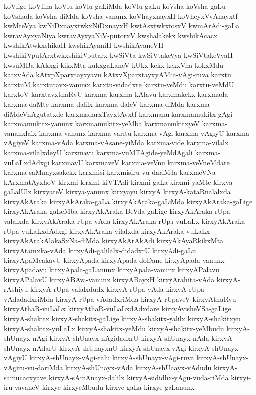 {koVlige
koVlina
koVlu
koVlu-gaLiMda
koVlu-gaLu
koVsha
koVsha-gaLu
koVshada
koVsha-diMda
koVsha-vanunx
koVhayxnayxH
koVheyxVvAnayxtf
kwMteVya
kwNiDxnayxtwkxNiDxnayxH
kwtAsxtwkxtosxV
kwmArAdi-gaLa
kwravAyxyaNiya
kwravAyxyaNiV-putorxV
kwshalakekx
kwshikAcacx
kwshikAtwkxshikaH
kwshikAyaniH
kwshikAyaneVH
kwshikiVputArxtwkxshikiVputarx
kwSiVta
kwSiVtakeVya
kwSiVtakeVyaH
kwsuMBa
kAkxgi
kikxMta
kukxgaLaneV
kUkx
kekx
kekxVna
kokxMdu
katxvAda
kAtxpXparxtayxyavu
kAtxvXparxtayxyAMta-vAgi-ruva
karxtu
karxtuM
karxtutavx-vanunx
karxtu-vidadxre
karxtu-veMdu
karxtu-veMdU
karxtoV
karxtavxthaRvU
karxma
karxma-kAlavu
karxmakekx
karxmada
karxma-daMte
karxma-dalilx
karxma-daleV
karxma-diMda
karxma-diMdeVnAgutatxde
karxmadarxTayxtAvxtf
karxmanu
karxmamukitx-gAgi
karxmamukitx-yanunx
karxmamukitx-yeMba
karxmamukitxyeV
karxma-vananxlalx
karxma-vanunx
karxma-varitu
karxma-vAgi
karxma-vAgiyU
karxma-vAgiyeV
karxma-vAda
karxma-vAsane-yiMda
karxma-vide
karxma-vilalx
karxma-vilalxdeyU
karxmavu
karxma-vuMTAgide-yeMdAgali
karxma-vuLaLxdAdxgi
karxmavU
karxmaveV
karxma-veVnu
karxma-veVneMdare
karxma-saMnayxsakekx
karxmisi
karxmisiru-vu-dariMda
karxmeVNa
kArxmatAyxhoV
kirxmi
kirxmi-kiVTAdi
kirxmi-gaLa
kirxmi-yaMte
kirxya-gaLalUlx
kirxyateV
kirxya-yanunx
kirxyayu
kirxyA
kirxyA-kataRnalalxda
kirxyAkAraka
kirxyAkAraka-gaLa
kirxyAkAraka-gaLiMda
kirxyAkAraka-gaLige
kirxyAkAraka-gaLeMba
kirxyAkAraka-BeVda-gaLige
kirxyAkAraka-rUpa-valalxda
kirxyAkAraka-rUpa-vAda
kirxyAkAraka-rUpa-vuLaLx
kirxyAkAraka-rUpa-vuLaLxdAdxgi
kirxyAkAraka-vilalxda
kirxyAkAraka-vuLaLx
kirxyAkArakAlakaSxNa-diMda
kirxyAkArAkAdi
kirxyAkAyaRkikxMta
kirxyAtamxka-vAda
kirxyAdi-galilalx-didadxrU
kirxyAdi-gaLu
kirxyApaMcakavU
kirxyApada
kirxyApada-doDane
kirxyApada-vanunx
kirxyApadavu
kirxyApala-gaLanunx
kirxyApala-vanunx
kirxyAPalavu
kirxyAPalavU
kirxyABAva-vanunx
kirxyABayxH
kirxyArahita-vAda
kirxyA-rAshiyu
kirxyA-rUpa-valalxdudx
kirxyA-rUpa-vAda
kirxyA-rUpa-vAdadadxriMda
kirxyA-rUpa-vAdadxriMda
kirxyA-rUpaveV
kirxyAthaRvu
kirxyAthaR-vuLaLx
kirxyAthaR-vuLaLxdAdxdare
kirxyAvisheVSa-gaLige
kirxyA-shakitx
kirxyA-shakitx-gaLige
kirxyA-shakitx-yalilx
kirxyA-shakitxyu
kirxyA-shakitx-yuLaLx
kirxyA-shakitx-yeMdu
kirxyA-shakitx-yeMbudu
kirxyA-shUnayx-nAgi
kirxyA-shUnayx-nAgidadxrU
kirxyA-shUnayx-nAda
kirxyA-shUnayx-nAdarU
kirxyA-shUnayxnU
kirxyA-shUnayx-vAgi
kirxyA-shUnayx-vAgiyU
kirxyA-shUnayx-vAgi-ralu
kirxyA-shUnayx-vAgi-ruva
kirxyA-shUnayx-vAgiru-vu-dariMda
kirxyA-shUnayx-vAda
kirxyA-shUnayx-vAdudu
kirxyA-samucacxyave
kirxyA-sAmAnayx-dalilx
kirxyA-sididhx-yAgu-vuda-riMda
kirxyi-iru-vavaneV
kirxye
kirxyeMbudu
kirxye-gaLa
kirxye-gaLanunx
}
